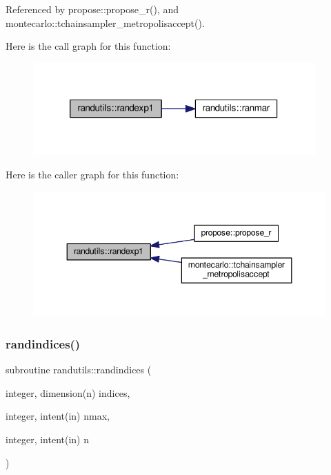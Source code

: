 Referenced by propose\+::propose\+\_\+r(), and montecarlo\+::tchainsampler\+\_\+metropolisaccept().

Here is the call graph for this function\+:
\nopagebreak
\begin{figure}[H]
\begin{center}
\leavevmode
\includegraphics[width=306pt]{namespacerandutils_a4ab2d2d677da8e5a41e18804782dd952_cgraph}
\end{center}
\end{figure}
Here is the caller graph for this function\+:
\nopagebreak
\begin{figure}[H]
\begin{center}
\leavevmode
\includegraphics[width=348pt]{namespacerandutils_a4ab2d2d677da8e5a41e18804782dd952_icgraph}
\end{center}
\end{figure}
\mbox{\label{namespacerandutils_ad5f2ab70ffa569eab34dede61e38f4a0}} 
\subsubsection{\texorpdfstring{randindices()}{randindices()}}
{\footnotesize\ttfamily subroutine randutils\+::randindices (\begin{DoxyParamCaption}\item[{integer, dimension(n)}]{indices,  }\item[{integer, intent(in)}]{nmax,  }\item[{integer, intent(in)}]{n }\end{DoxyParamCaption})}



